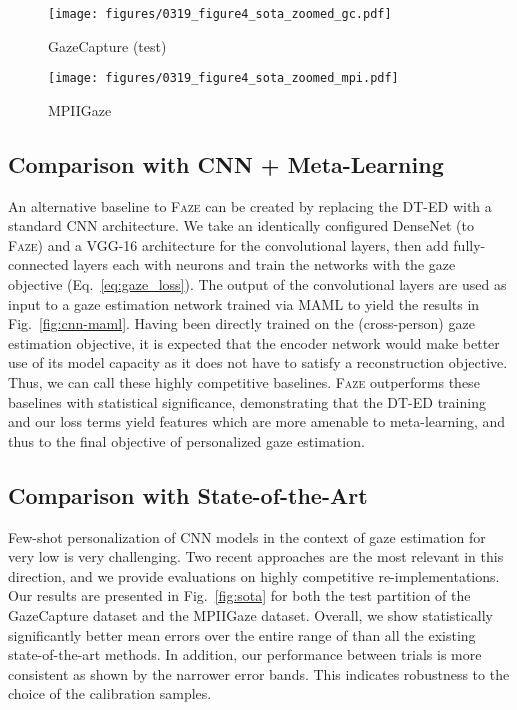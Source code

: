 \documentclass[10pt,twocolumn,letterpaper]{article}
\newcommand{\faze}[0]{\textsc{Faze}\xspace}
\begin{document}
\begin{figure*}
    \centering
    \begin{subfigure}[b]{0.48\textwidth}
        \texttt{[image: figures/0319\_figure4\_sota\_zoomed\_gc.pdf]}
        \vskip -1mm
        \caption{GazeCapture (test)}
        \label{fig:sota_gc}
    \end{subfigure}
    \hspace*{\fill}
    \begin{subfigure}[b]{0.48\textwidth}
        \texttt{[image: figures/0319\_figure4\_sota\_zoomed\_mpi.pdf]}
        \vskip -1mm
        \caption{MPIIGaze}
        \label{fig:sota_mpi}
    \end{subfigure}
    \vskip -2mm
    \caption{Comparison of \faze against state-of-the-art person-specific gaze estimation methods \cite{Liu2018BMVC,Zhang2019CHI}
    }
    \label{fig:sota}
    \vskip -3mm
\end{figure*}


\subsection{Comparison with CNN + Meta-Learning}
An alternative baseline to \faze can be created by replacing the DT-ED with a standard CNN 
architecture.
We take an identically configured DenseNet (to \faze) and a VGG-16 architecture for the convolutional layers, then add  fully-connected layers each with  neurons and train the networks with the gaze objective (Eq.~\ref{eq:gaze_loss}).
The output of the convolutional layers are used as input to a gaze estimation network trained via MAML to yield the results in Fig.~\ref{fig:cnn-maml}.
Having been directly trained on the (cross-person) gaze estimation objective, it is expected that the encoder network would make better use of its model capacity as it does not have to satisfy a reconstruction objective. Thus, we can call these highly competitive baselines.
\faze outperforms these baselines with statistical significance, demonstrating that the DT-ED training and our loss terms yield features which are more amenable to meta-learning, and thus to the final objective of personalized gaze estimation.

\subsection{Comparison with State-of-the-Art}

 
Few-shot personalization of CNN models in the context of gaze estimation for very low  is very challenging.
Two recent approaches \cite{Zhang2019CHI,Liu2018BMVC} are the most relevant in this direction, and we provide evaluations on highly competitive re-implementations.
Our results are presented in Fig.~\ref{fig:sota} for both the test partition of the GazeCapture dataset and the MPIIGaze dataset.
Overall, we show statistically significantly better mean errors over the entire range of  than all the existing state-of-the-art methods.
In addition, our performance between trials is more consistent as shown by the narrower error bands. This indicates robustness to the choice of the  calibration samples. 
\end{document}
